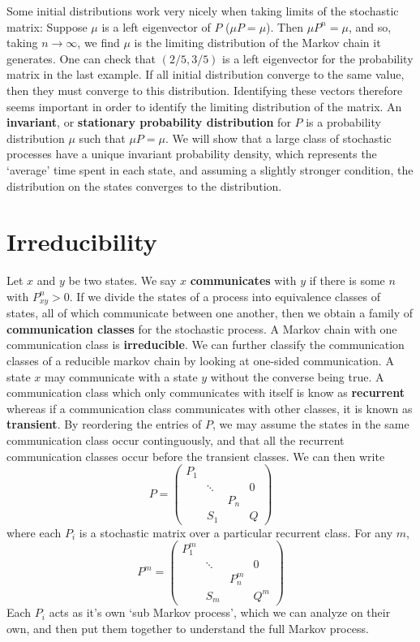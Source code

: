 Some initial distributions work very nicely when taking limits of the stochastic matrix: Suppose $\mu$ is a left eigenvector of $P$ ($\mu P = \mu$). Then $\mu P^n = \mu$, and so, taking $n \to \infty$, we find $\mu$ is the limiting distribution of the Markov chain it generates. One can check that $(2/5, 3/5)$ is a left eigenvector for the probability matrix in the last example. If all initial distribution converge to the same value, then they must converge to this distribution. Identifying these vectors therefore seems important in order to identify the limiting distribution of the matrix. An {\bf invariant}, or {\bf stationary probability distribution} for $P$ is a probability distribution $\mu$ such that $\mu P = \mu$. We will show that a large class of stochastic processes have a unique invariant probability density, which represents the `average' time spent in each state, and assuming a slightly stronger condition, the distribution on the states converges to the distribution.

\section{Irreducibility}

Let $x$ and $y$ be two states. We say $x$ {\bf communicates} with $y$ if there is some $n$ with $P^n_{xy} > 0$. If we divide the states of a process into equivalence classes of states, all of which communicate between one another, then we obtain a family of {\bf communication classes} for the stochastic process. A Markov chain with one communication class is {\bf irreducible}. We can further classify the communication classes of a reducible markov chain by looking at one-sided communication. A state $x$ may communicate with a state $y$ without the converse being true. A communication class which only communicates with itself is know as {\bf recurrent} whereas if a communication class communicates with other classes, it is known as {\bf transient}. By reordering the entries of $P$, we may assume the states in the same communication class occur continguously, and that all the recurrent communication classes occur before the transient classes. We can then write
%
\[ P = \begin{pmatrix} P_1 & & & \\ &\ddots & & 0 \\  & & P_n & \\ & S_1 & & Q \end{pmatrix} \]
%
where each $P_i$ is a stochastic matrix over a particular recurrent class. For any $m$,
%
\[ P^m = \begin{pmatrix} P_1^m & & & \\ &\ddots & & 0 \\  & & P^m_n & \\ & S_m & & Q^m \end{pmatrix} \]
%
Each $P_i$ acts as it's own `sub Markov process', which we can analyze on their own, and then put them together to understand the full Markov process.

